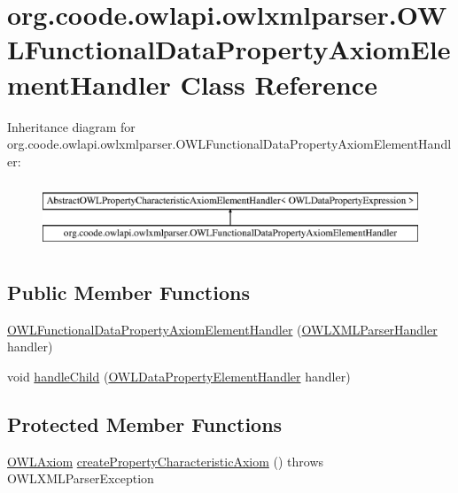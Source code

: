 \hypertarget{classorg_1_1coode_1_1owlapi_1_1owlxmlparser_1_1_o_w_l_functional_data_property_axiom_element_handler}{\section{org.\-coode.\-owlapi.\-owlxmlparser.\-O\-W\-L\-Functional\-Data\-Property\-Axiom\-Element\-Handler Class Reference}
\label{classorg_1_1coode_1_1owlapi_1_1owlxmlparser_1_1_o_w_l_functional_data_property_axiom_element_handler}
}
Inheritance diagram for org.\-coode.\-owlapi.\-owlxmlparser.\-O\-W\-L\-Functional\-Data\-Property\-Axiom\-Element\-Handler\-:\begin{figure}[H]
\begin{center}
\leavevmode
\includegraphics[height=2.000000cm]{classorg_1_1coode_1_1owlapi_1_1owlxmlparser_1_1_o_w_l_functional_data_property_axiom_element_handler}
\end{center}
\end{figure}
\subsection*{Public Member Functions}
\begin{DoxyCompactItemize}
\item 
\hyperlink{classorg_1_1coode_1_1owlapi_1_1owlxmlparser_1_1_o_w_l_functional_data_property_axiom_element_handler_a2222e8b2f184208b0ff4bb9cfaec701f}{O\-W\-L\-Functional\-Data\-Property\-Axiom\-Element\-Handler} (\hyperlink{classorg_1_1coode_1_1owlapi_1_1owlxmlparser_1_1_o_w_l_x_m_l_parser_handler}{O\-W\-L\-X\-M\-L\-Parser\-Handler} handler)
\item 
void \hyperlink{classorg_1_1coode_1_1owlapi_1_1owlxmlparser_1_1_o_w_l_functional_data_property_axiom_element_handler_a1a1bdd72e871d0cdf079a4f4e3270e9c}{handle\-Child} (\hyperlink{classorg_1_1coode_1_1owlapi_1_1owlxmlparser_1_1_o_w_l_data_property_element_handler}{O\-W\-L\-Data\-Property\-Element\-Handler} handler)
\end{DoxyCompactItemize}
\subsection*{Protected Member Functions}
\begin{DoxyCompactItemize}
\item 
\hyperlink{interfaceorg_1_1semanticweb_1_1owlapi_1_1model_1_1_o_w_l_axiom}{O\-W\-L\-Axiom} \hyperlink{classorg_1_1coode_1_1owlapi_1_1owlxmlparser_1_1_o_w_l_functional_data_property_axiom_element_handler_ab4691f993bdef09c5bec4bb3cce0daf6}{create\-Property\-Characteristic\-Axiom} ()  throws O\-W\-L\-X\-M\-L\-Parser\-Exception 
\end{DoxyCompactItemize}


